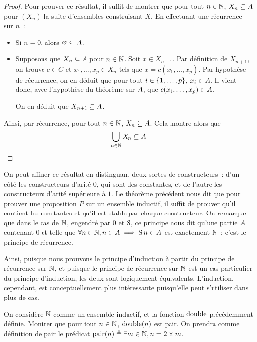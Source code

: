 \begin{proof}
  Pour prouver ce résultat, il suffit de montrer que pour tout $n\in\mathbb N$,
  $X_n \subseteq A$ pour $(X_n)$ la suite d'ensembles construisant $X$. En
  effectuant une récurrence sur $n$~:
  \begin{itemize}
  \item Si $n = 0$, alors $\varnothing \subseteq A$.
  \item Supposons que $X_n \subseteq A$ pour $n \in \mathbb N$. Soit
    $x \in X_{n+1}$. Par définition de $X_{n+1}$, on trouve $c \in C$ et
    $x_1,\ldots,x_p \in X_n$ tels que $x = c(x_1,\ldots,x_p)$. Par hypothèse
    de récurrence, on en déduit que pour tout $i\in\{1,\ldots,p\}$,
    $x_i\in A$.
    Il vient donc, avec l'hypothèse du théorème sur $A$, que
    $c(x_1,\ldots,x_p)\in A$.

    On en déduit que $X_{n+1}\subseteq A$.
  \end{itemize}

  \noindent
  Ainsi, par récurrence, pour tout $n\in \mathbb N$, $X_n \subseteq A$.
  Cela montre alors que
  \[\bigcup_{n \in \mathbb N} X_n \subseteq A\qedhere\]
\end{proof}

On peut affiner ce résultat en distinguant deux sortes de constructeurs~: d'un
côté les constructeurs d'arité $0$, qui sont des constantes, et de l'autre les
constructeurs d'arité supérieure à $1$. Le théorème précédent nous dit que pour
prouver une proposition $P$ sur un ensemble inductif, il suffit de prouver qu'il
contient les constantes et qu'il est stable par chaque constructeur. On remarque
que dans le cas de $\mathbb N$, engendré par $0$ et $\operatorname{S}$, ce principe nous dit
qu'une partie $A$ contenant $0$ et telle que
$\forall n\in\mathbb N, n\in A \implies \operatorname{S} n\in A$ est exactement $\mathbb N$~:
c'est le principe de récurrence.

Ainsi, puisque nous prouvons le principe d'induction à partir du principe de
récurrence sur $\mathbb N$, et puisque le principe de récurrence sur $\mathbb N$ est un cas
particulier du principe d'induction, les deux sont logiquement équivalents.
L'induction, cependant, est conceptuellement plus intéressante puisqu'elle peut
s'utiliser dans plus de cas.

\begin{exercise}
  On considère $\mathbb N$ comme un ensemble inductif, et la fonction $\operatorname{double}$
  précédemment définie. Montrer que pour tout $n \in \mathbb N$,
  $\operatorname{double}(n)$ est pair. On prendra comme définition de pair le prédicat
  $\operatorname{pair}(n) \triangleq \exists m\in\mathbb N, n = 2 \times m$.
\end{exercise}

